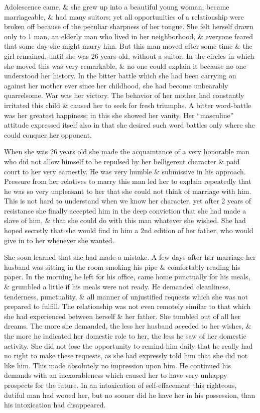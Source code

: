 \documentclass{article}
\begin{document}
Adolescence came, \& she grew up into a beautiful young woman, became marriageable, \& had many suitors; yet all opportunities of a relationship were broken off because of the peculiar sharpness of her tongue. She felt herself drawn only to 1 man, an elderly man who lived in her neighborhood, \& everyone feared that some day she might marry him. But this man moved after some time \& the girl remained, until she was 26 years old, without a suitor. In the circles in which she moved this was very remarkable, \& no one could explain it because no one understood her history. In the bitter battle which she had been carrying on against her mother ever since her childhood, she had become unbearably quarrelsome. War was her victory. The behavior of her mother had constantly irritated this child \& caused her to seek for fresh triumphs. A bitter word-battle was her greatest happiness; in this she showed her vanity. Her ``masculine'' attitude expressed itself also in that she desired such word battles only where she could conquer her opponent.

When she was 26 years old she made the acquaintance of a very honorable man who did not allow himself to be repulsed by her belligerent character \& paid court to her very earnestly. He was very humble \& submissive in his approach. Pressure from her relatives to marry this man led her to explain repeatedly that he was so very unpleasant to her that she could not think of marriage with him. This is not hard to understand when we know her character, yet after 2 years of resistance she finally accepted him in the deep conviction that she had made a slave of him, \& that she could do with this man whatever she wished. She had hoped secretly that she would find in him a 2nd edition of her father, who would give in to her whenever she wanted.

She soon learned that she had made a mistake. A few days after her marriage her husband was sitting in the room smoking his pipe \& comfortably reading his paper. In the morning he left for his office, came home punctually for his meals, \& grumbled a little if his meals were not ready. He demanded cleanliness, tenderness, punctuality, \& all manner of unjustified requests which she was not prepared to fulfill. The relationship was not even remotely similar to that which she had experienced between herself \& her father. She tumbled out of all her dreams. The more she demanded, the less her husband acceded to her wishes, \& the more he indicated her domestic role to her, the less he saw of her domestic activity. She did not lose the opportunity to remind him daily that he really had no right to make these requests, as she had expressly told him that she did not like him. This made absolutely no impression upon him. He continued his demands with an inexorableness which caused her to have very unhappy prospects for the future. In an intoxication of self-effacement this righteous, dutiful man had wooed her, but no sooner did he have her in his possession, than his intoxication had disappeared.
\end{document}
